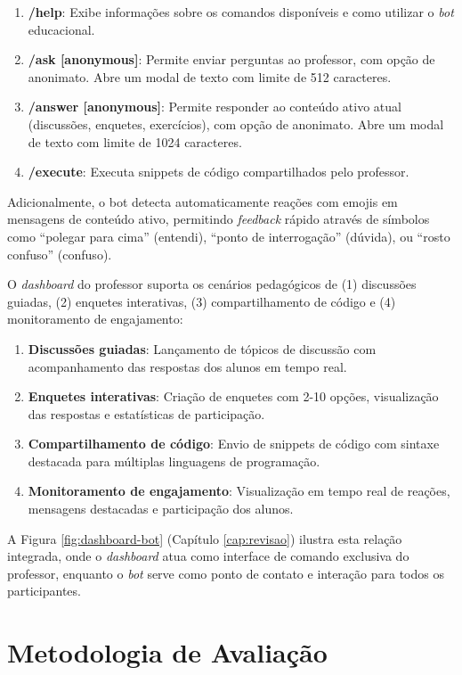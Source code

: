 \begin{enumerate}
\item \textbf{/help}: Exibe informações sobre os comandos disponíveis e como
utilizar o \textit{bot} educacional.
\item \textbf{/ask [anonymous]}: Permite enviar perguntas ao professor, com
opção de anonimato. Abre um modal de texto com limite de 512 caracteres.
\item \textbf{/answer [anonymous]}: Permite responder ao conteúdo ativo atual
(discussões, enquetes, exercícios), com opção de anonimato. Abre um modal de
texto com limite de 1024 caracteres.
\item \textbf{/execute}: Executa snippets de código compartilhados pelo
professor.
\end{enumerate}

Adicionalmente, o bot detecta automaticamente reações com emojis em mensagens de
conteúdo ativo, permitindo \textit{feedback} rápido através de símbolos como
``polegar para cima'' (entendi), ``ponto de interrogação'' (dúvida), ou ``rosto
confuso'' (confuso).

O \textit{dashboard} do professor suporta os cenários pedagógicos de (1)
discussões guiadas, (2) enquetes interativas, (3) compartilhamento de código e
(4) monitoramento de engajamento:

\begin{enumerate}
\item \textbf{Discussões guiadas}: Lançamento de tópicos de discussão com
acompanhamento das respostas dos alunos em tempo real.
\item \textbf{Enquetes interativas}: Criação de enquetes com 2-10 opções,
visualização das respostas e estatísticas de participação.
\item \textbf{Compartilhamento de código}: Envio de snippets de código com
sintaxe destacada para múltiplas linguagens de programação.
\item \textbf{Monitoramento de engajamento}: Visualização em tempo real de
reações, mensagens destacadas e participação dos alunos.
\end{enumerate}

A Figura \ref{fig:dashboard-bot} (Capítulo \ref{cap:revisao}) ilustra esta
relação integrada, onde o \textit{dashboard} atua como interface de comando
exclusiva do professor, enquanto o \textit{bot} serve como ponto de contato e
interação para todos os participantes.

\section{Metodologia de Avaliação}
\label{sec:metodologia}

